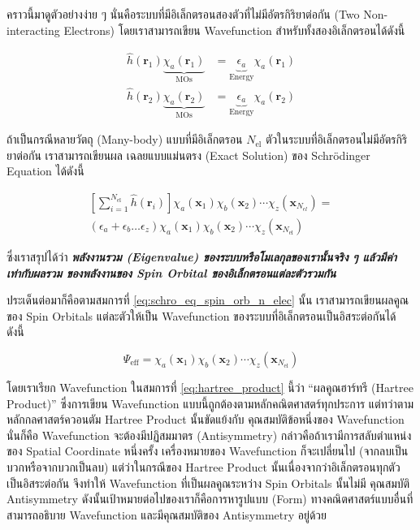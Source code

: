 คราวนี้มาดูตัวอย่างง่าย ๆ นั่นคือระบบที่มีอิเล็กตรอนสองตัวที่ไม่มีอัตรกิริยาต่อกัน (Two Non-interacting Electrons) โดยเราสามารถเขียน
Wavefunction สำหรับทั้งสองอิเล็กตรอนได้ดังนี้

\begin{align}\label{eq:hamil_spin_orb_two_elec}
    \hat{h}(\bm{r}_{1}) \underbrace{\chi_{a}(\bm{r}_{1})}_{\text{MOs}} & =
    \underbrace{\epsilon_{a}}_{\text{Energy}} \chi_{a}(\bm{r}_{1})         \\
    \hat{h}(\bm{r}_{2}) \underbrace{\chi_{a}(\bm{r}_{2})}_{\text{MOs}} & =
    \underbrace{\epsilon_{a}}_{\text{Energy}} \chi_{a}(\bm{r}_{2})
\end{align}

ถ้าเป็นกรณีหลายวัตถุ (Many-body) แบบที่มีอิเล็กตรอน $N_{\text{el}}$ ตัวในระบบที่อิเล็กตรอนไม่มีอัตรกิริยาต่อกัน เราสามารถเขียนผล%
เฉลยแบบแม่นตรง (Exact Solution) ของ Schr\"{o}dinger Equation ได้ดังนี้

\begin{multline}\label{eq:schro_eq_spin_orb_n_elec}
    \left [ \sum_{i=1}^{N_{\text{el}}} \hat{h}(\bm{r}_{i}) \right ] \chi_{a}(\bm{x}_{1}) \chi_{b}(\bm{x}_{2})
    \cdots \chi_{z}(\bm{x}_{N_{el}}) = \\
    (\epsilon_{a} + \epsilon_{b} \dots \epsilon_{z}) \chi_{a}(\bm{x}_{1}) \chi_{b}(\bm{x}_{2}) \cdots
    \chi_{z}(\bm{x}_{N_{\text{el}}})
\end{multline}

\noindent ซึ่งเราสรุปได้ว่า \textbf{\textit{พลังงานรวม (Eigenvalue) ของระบบหรือโมเลกุลของเรานั้นจริง ๆ แล้วมีค่าเท่ากับผลรวม%
        ของพลังงานของ Spin Orbital ของอิเล็กตรอนแต่ละตัวรวมกัน}}

ประเด็นต่อมาก็คือตามสมการที่ \eqref{eq:schro_eq_spin_orb_n_elec} นั้น เราสามารถเขียนผลคูณของ Spin Orbitals แต่ละตัวให้เป็น
Wavefunction ของระบบที่อิเล็กตรอนเป็นอิสระต่อกันได้ ดังนี้

\begin{equation}\label{eq:hartree_product}
    \Psi_{\text{eff}} = \chi_{a}(\bm{x}_{1}) \chi_{b}(\bm{x}_{2}) \cdots \chi_{z}(\bm{x}_{N_{\text{el}}})
\end{equation}

\noindent โดยเราเรียก Wavefunction ในสมการที่ \eqref{eq:hartree_product} นี้ว่า \enquote{ผลคูณฮาร์ทรี (Hartree Product)}
ซึ่งการเขียน Wavefunction แบบนี้ถูกต้องตามหลักคณิตศาสตร์ทุกประการ แต่ทว่าตามหลักกลศาสตร์ควอนตัม Hartree Product นั้นขัดแย้งกับ%
คุณสมบัติข้อหนึ่งของ Wavefunction นั่นก็คือ Wavefunction จะต้องมีปฏิสมมาตร (Antisymmetry) กล่าวคือถ้าเรามีการสลับตำแหน่งของ
Spatial Coordinate หนึ่งครั้ง เครื่องหมายของ Wavefunction ก็จะเปลี่ยนไป (จากลบเป็นบวกหรือจากบวกเป็นลบ) แต่ว่าในกรณีของ
Hartree Product นั้นเนื่องจากว่าอิเล็กตรอนทุกตัวเป็นอิสระต่อกัน จึงทำให้ Wavefunction ที่เป็นผลคูณระหว่าง Spin Orbitals นั้นไม่มี%
คุณสมบัติ Antisymmetry ดังนั้นเป้าหมายต่อไปของเราก็คือการหารูปแบบ (Form) ทางคณิตศาสตร์แบบอื่นที่สามารถอธิบาย Wavefunction
และมีคุณสมบัติของ Antisymmetry อยู่ด้วย

